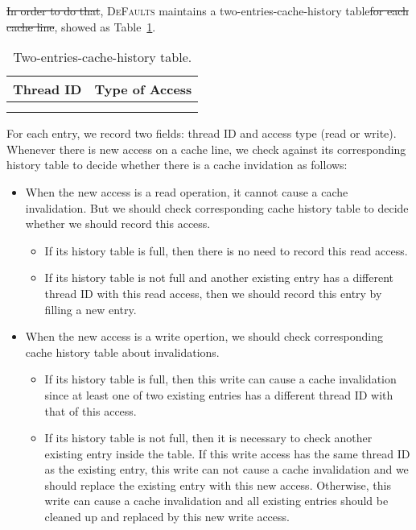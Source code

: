 \documentclass[10pt]{sigplanconf}
\newcommand{\Defaults}{{\scshape DeFaults}}
\providecommand{\DIFadd}[1]{{\protect\color{blue}\uwave{#1}}} %
\providecommand{\DIFdel}[1]{{\protect\color{red}\sout{#1}}}                      %
\providecommand{\DIFaddbegin}{} %
\providecommand{\DIFaddend}{} %
\providecommand{\DIFdelbegin}{} %
\providecommand{\DIFdelend}{} %
\begin{document}
\DIFdelbegin \DIFdel{In order to do that}\DIFdelend \DIFaddbegin \DIFadd{For each cache line}\DIFaddend , \Defaults{} maintains a two-entries-cache-history table\DIFdelbegin \DIFdel{for each cache line}\DIFdelend , showed as Table~\ref{table:cachehistory}. 

\begin{table}
\centering
  \begin{tabular}{ l | r }
    \hline
    {Thread ID} & {Type of Access} \\ \hline
    \hline
     &   \\ \hline
     &   \\ \hline
  \end{tabular}
  \caption{Two-entries-cache-history table. \label{table:cachehistory}}
\end{table} 

For each entry, we record two fields: thread ID and access type (read or write). 
Whenever there is new access on a cache line, we check against its corresponding history table 
to decide whether there is a cache invidation as follows:

\begin{itemize}
\item
When the new access is a read operation, it cannot cause a cache invalidation. But we should check corresponding cache history table 
to decide whether we should record this access.
  \begin{itemize}
    \item
    If its history table is full, then there is no need to record this read access.
    \item
    If its history table is not full and another existing entry has a different thread ID with this read access, then we should record this 
    entry by filling a new entry. 
  \end{itemize}
\item
When the new access is a write opertion, we should check corresponding cache history table about invalidations.
  \begin{itemize}
    \item
    If its history table is full, then this write can cause a cache invalidation since at least one of two existing entries has a different 
    thread ID with that of this access. 
    \item
    If its history table is not full, then it is necessary to check another existing entry inside the table. If this write access has the same    thread ID as the existing entry, this write can not cause a cache invalidation and we should replace the existing entry with this new access. Otherwise, this write can cause a cache invalidation and all existing entries should be cleaned up and replaced by this new write access.
  \end{itemize}
\end{itemize}
\end{document}
